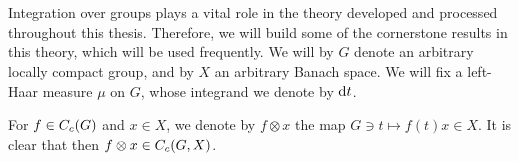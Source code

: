 \chapter{}
\apptitle
{}
Integration over groups plays a vital role in the theory developed and processed throughout this thesis. Therefore, we will build some of the cornerstone results in this theory, which will be used frequently. We will by $G$ denote an arbitrary locally compact group, and by $X$ an arbitrary Banach space. We will fix a left-Haar measure $\mu$ on $G$, whose integrand we denote by $\mathrm{d} t$.

For $f \in C_c(G)$ and $x \in X$, we denote by $f \otimes x$ the map $G \ni t \mapsto f(t)x \in X$. It is clear that then $f \otimes x \in C_c(G,X)$.
